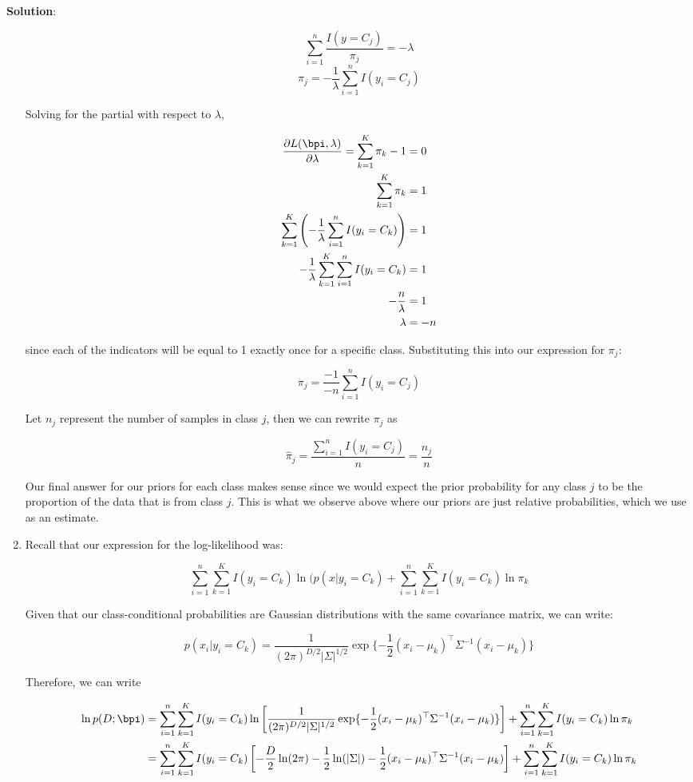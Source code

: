 \documentclass[submit]{../harvardml}
\newenvironment{solution}{
    \vspace{2mm}
    \color{blue}\noindent\textbf{Solution}:
}{}
\begin{document}
\begin{solution}
\begin{enumerate}
    \[
    \sum_{i=1}^n \frac{I(y=C_j)}{\pi_j} = - \lambda
    \]
    \[
    \pi_j = -\frac{1}{\lambda} \sum_{i=1}^n I(y_i = C_j)
    \]

    Solving for the partial with respect to $\lambda$,

    \begin{align*}
        \frac{\partial L(\bpi, \lambda)}{\partial \lambda} = \sum_{k=1}^K \pi_k - 1 &= 0 \\
        \sum_{k=1}^K \pi_k &= 1 \\
        \sum_{k=1}^K \left(-\frac{1}{\lambda} \sum_{i=1}^n I(y_i = C_k)\right) &= 1 \\
        -\frac{1}{\lambda}\sum_{k=1}^K \sum_{i=1}^n I(y_i = C_k) &= 1 \\
        -\frac{n}{\lambda} &= 1 \\
        \lambda &= -n
    \end{align*}

    since each of the indicators will be equal to 1 exactly once for a specific class. Substituting this into our expression for $\pi_j$:

    \[
    \pi_j = \frac{-1}{-n}\sum_{i=1}^n I(y_i = C_j)
    \]

    Let $n_j$ represent the number of samples in class $j$, then we can rewrite $\pi_j$ as

    \[
    \boxed{\hat \pi_j = \frac{\sum_{i=1}^nI(y_i = C_j)}{n}= \frac{n_j}{n}}
    \]

    Our final answer for our priors for each class makes sense since we would expect the prior probability for any class $j$ to be the proportion of the data that is from class $j$. This is what we observe above where our priors are just relative probabilities, which we use as an estimate.

    \item Recall that our expression for the log-likelihood was:

    \[
    \sum_{i=1}^n\sum_{k=1}^K I(y_i=C_k)\ln(p(x|y_i=C_k) + \sum_{i=1}^n\sum_{k=1}^K I(y_i=C_k) \ln \pi_k
    \]

    Given that our class-conditional probabilities are Gaussian distributions with the same covariance matrix, we can write:

    \[
    p(x_i | y_i = C_k) = \frac{1}{(2\pi)^{D/2}|\Sigma|^{1/2}}\exp\{-\frac{1}{2}(x_i - \mu_k)^\top \Sigma^{-1} (x_i - \mu_k)\}
    \]

    Therefore, we can write

    \begin{align*}
        \ln p(D;\bpi) &= \sum_{i=1}^n\sum_{k=1}^K I(y_i=C_k)\ln\left[\frac{1}{(2\pi)^{D/2}|\Sigma|^{1/2}}\exp\{-\frac{1}{2}(x_i - \mu_k)^\top \Sigma^{-1} (x_i - \mu_k)\}\right] + \sum_{i=1}^n\sum_{k=1}^K I(y_i=C_k) \ln \pi_k \\
        &= \sum_{i=1}^n\sum_{k=1}^K I(y_i=C_k)\left[ -\frac{D}{2} \ln (2\pi) - \frac{1}{2} \ln (|\Sigma|) -\frac{1}{2}(x_i - \mu_k)^\top \Sigma^{-1} (x_i - \mu_k)\right] + \sum_{i=1}^n\sum_{k=1}^K I(y_i=C_k) \ln \pi_k
    \end{align*}


\end{enumerate}
\end{solution}
\end{document}
